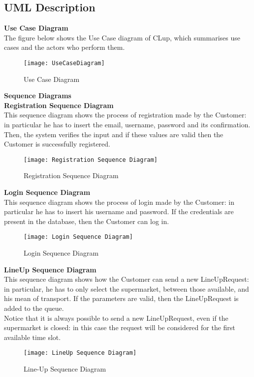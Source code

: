 \subsection{UML Description}

\textbf{Use Case Diagram} \\
The figure below shows the Use Case diagram of CLup, which summarises use cases and the actors who perform them. \\
\begin{figure}[H] 
\centerline{\texttt{[image: UseCaseDiagram]}}
\caption{Use Case Diagram} 
\end{figure}


\textbf{Sequence Diagrams} \\
\textbf{Registration Sequence Diagram} \\
This sequence diagram shows the process of registration made by the Customer: in particular he has to insert the email, username, password and its confirmation. Then, the system verifies the input and if these values are valid then the Customer is successfully registered.
\begin{figure}[H] 
\centerline{\texttt{[image: Registration Sequence Diagram]}}
\caption{Registration Sequence Diagram}
\end{figure}



\textbf{Login Sequence Diagram} \\
This sequence diagram shows the process of login made by the Customer: in particular he has to insert his username and password. If the credentials are present in the database, then the Customer can log in.
\begin{figure}[H] 
\centerline{\texttt{[image: Login Sequence Diagram]}}
\caption{Login Sequence Diagram}
\end{figure}


\textbf{LineUp Sequence Diagram} \\
This sequence diagram shows how the Customer can send a new LineUpRequest: in particular, he has to only select the supermarket, between those available, and his mean of transport. If the parameters are valid, then the LineUpRequest is added to the queue. \\
Notice that it is always possible to send a new LineUpRequest, even if the supermarket is closed: in this case the request will be considered for the first available time slot.
\begin{figure}[H] 
\centerline{\texttt{[image: LineUp Sequence Diagram]}}
\caption{Line-Up Sequence Diagram}
\end{figure}



